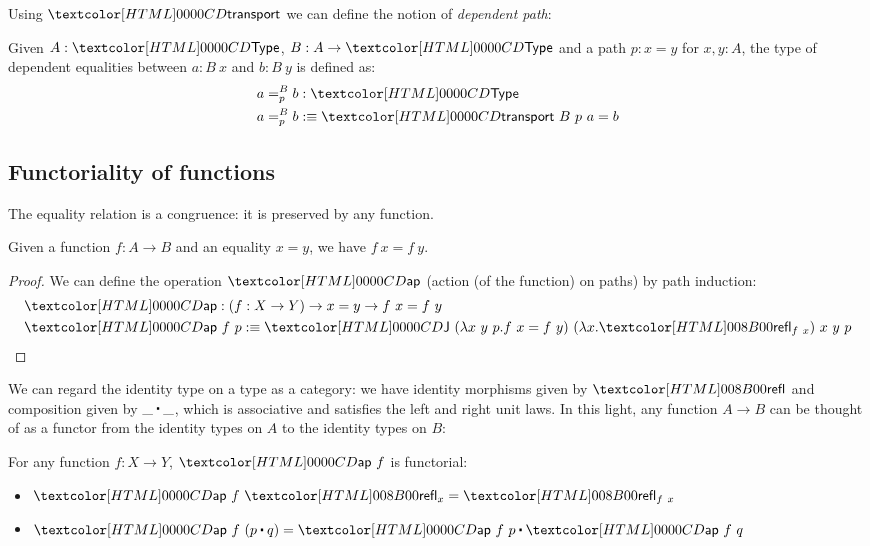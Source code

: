 Using $\transport$ we can define the notion of \emph{dependent path}:
\begin{definition}
  Given $A : \Type$, $B : A \to \Type$ and a path $p : x = y$ for
  $x, y : A$, the type of dependent equalities between $a : B\ x$ and
  $b : B\ y$ is defined as:
  \begin{align*}
    &\pathover{B}{p}{a}{b} : \Type \\
    &\pathover{B}{p}{a}{b} \ddefeq \transport\ B\ p\ a = b
  \end{align*}
\end{definition}

\subsection{Functoriality of functions}

The equality relation is a congruence: it is preserved by any function.

\begin{proposition}
  Given a function $f : A \to B$ and an equality $x = y$, we have
  $f\ x = f\ y$.
\end{proposition}

\begin{proof}
  We can define the operation $\ap$ (action (of the function) on
  paths) by path induction:
  \begin{align*}
    &\ap : (f : X \to Y) \to x = y \to f\ x = f\ y \\
    &\ap\ f\ p \ddefeq \J\ (\lambda x\ y\ p . f\ x = f\ y)\ (\lambda x . \refl_{f\ x})\ x\ y\ p
  \end{align*}
\end{proof}

We can regard the identity type on a type as a category: we have
identity morphisms given by $\refl$ and composition given by
$\trans{\_}{\_}$, which is associative and satisfies the left and
right unit laws. In this light, any function $A \to B$ can be thought
of as a functor from the identity types on $A$ to the identity types
on $B$:

\begin{proposition}
  For any function $f : X \to Y$, $\ap\ f$ is functorial:
  \begin{itemize}
  \item $\ap\ f\ \refl_x = \refl_{f\ x}$
  \item $\ap\ f\ (\trans{p}{q}) = \trans{\ap\ f\ p}{\ap\ f\ q}$
  \end{itemize}
\end{proposition}

